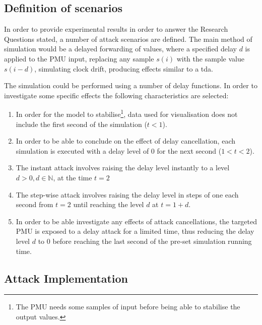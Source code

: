 \subsection{Definition of scenarios}
In order to provide experimental results in order to answer the Research Questions stated, a number of attack scenarios are defined.
The main method of simulation would be a delayed forwarding of values, where a specified delay $d$ is applied to the PMU input, replacing any sample $s(i)$ with the sample value $s(i-d)$, simulating clock drift, producing effects similar to a \acrlong{tda}.

The simulation could be performed using a number of delay functions. In order to investigate some specific effects the following characteristics are selected:



\begin{enumerate}
\item In order for the model to stabilise\footnote{The PMU needs some samples of input before being able to stabilise the output values.}, data used for visualisation does not include the first second of the simulation ($t < 1$).
\item In order to be able to conclude on the effect of delay cancellation, each simulation is executed  with a delay level of 0 for the next second ($1 < t < 2$). 
\item  The instant attack involves raising the delay level instantly to a level $d > 0,  d \in \mathbb{N}$, at the time $t = 2$
\item  The step-wise attack involves raising the delay level in steps of one each second from $t = 2$ until reaching the level $d$ at $t = 1+d$.  
\item  In order to be able investigate any effects of attack cancellations, the targeted PMU is exposed to a delay attack for a limited time, thus reducing the delay level $d$ to $0$ before reaching the last second of the pre-set simulation running time.   
\end{enumerate}
    


\subsection{Attack Implementation}

